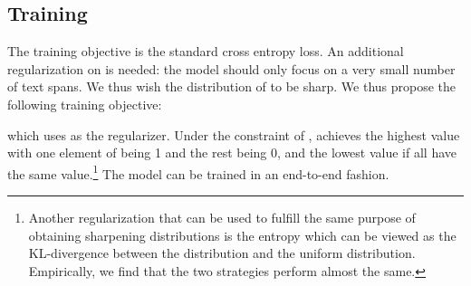 \documentclass[11pt,a4paper]{article}
\begin{document}
\subsection{Training}
The training objective is the standard cross entropy loss. An additional regularization on  is needed:  
the model should only focus on 
 a very small number of text spans. We thus wish the distribution of  to be sharp. 
  We thus propose the following training objective:
 
which uses  as the regularizer. Under the constraint of ,  achieves the highest value with one element of  being 1 and the rest being 0, and the lowest value if all  have the same value.\footnote{Another regularization that can be used to fulfill the same purpose
of obtaining sharpening distributions 
 is the entropy  which can be viewed as the KL-divergence between the distribution and the uniform distribution. Empirically, we find that the two strategies perform almost the same.}
 The model  can be trained in an end-to-end fashion.
 \begin{comment}
  in two different ways: the end-to-end fashion and the pipelined fashion. 
For the former, we 
can directly train Eq.\ref{objective} in an end-to-end fashion, and use  for interpretation. 
For the latter,
we can  first train a model based on vanilla transformers, BiLSTMs or CNNs to optimize ,
 where the SIC layer and the interpretation layer are not used.
Next, we fix the input layer and the intermediate layers and only update parameters for the SIC layer and the interpretation layer based on Eq.\ref{objective}. 
\end{comment}
\end{document}
